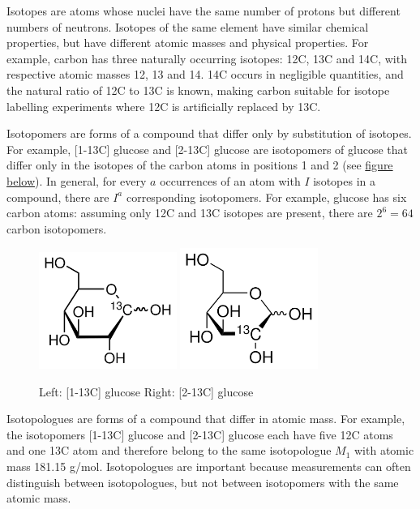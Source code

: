 \documentclass{article}
\begin{document}
Isotopes are atoms whose nuclei have the same number of protons but
different numbers of neutrons. Isotopes of the same element have similar
chemical properties, but have different atomic masses and physical
properties. For example, carbon has three naturally occurring isotopes:
12C, 13C and 14C, with respective atomic masses 12, 13 and 14. 14C
occurs in negligible quantities, and the natural ratio of 12C to 13C is
known, making carbon suitable for isotope labelling experiments where
12C is artificially replaced by 13C.

Isotopomers are forms of a compound that differ only by substitution of
isotopes. For example, {[}1-13C{]} glucose and {[}2-13C{]} glucose are
isotopomers of glucose that differ only in the isotopes of the carbon
atoms in positions 1 and 2 (see \hyperref[glucose]{figure below}). In
general, for every \(a\) occurrences of an atom with \(I\) isotopes in a
compound, there are \(I^a\) corresponding isotopomers. For example,
glucose has six carbon atoms: assuming only 12C and 13C isotopes are
present, there are \(2^6=64\) carbon isotopomers.

\begin{figure}[!h]
\centering
\includegraphics[width=0.4\textwidth, height=!]{img/1-13C-glucose.png}
\includegraphics[width=0.4\textwidth, height=!]{img/2-13C-glucose.png}
\caption{Left: [1-13C] glucose Right: [2-13C] glucose}
\label{glucose}
\end{figure}

Isotopologues are forms of a compound that differ in atomic mass. For
example, the isotopomers {[}1-13C{]} glucose and {[}2-13C{]} glucose
each have five 12C atoms and one 13C atom and therefore belong to the
same isotopologue \(M_1\) with atomic mass 181.15 g/mol. Isotopologues
are important because measurements can often distinguish between
isotopologues, but not between isotopomers with the same atomic mass.
\end{document}

